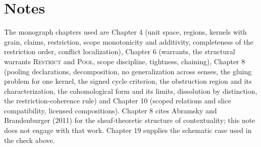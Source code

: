 \documentclass[11pt]{article}
\theoremstyle{plain}
\theoremstyle{definition}
\theoremstyle{remark}
\begin{document}
\section*{Notes}

The monograph chapters used are Chapter 4 (unit space, regions, kernels with grain, claims, restriction, scope monotonicity and additivity, completeness of the restriction order, conflict localization), Chapter 6 (warrants, the structural warrants \textsc{Restrict} and \textsc{Pool}, scope discipline, tightness, chaining), Chapter 8 (pooling declarations, decomposition, no generalization across senses, the gluing problem for one kernel, the signed cycle criterion, the obstruction region and its characterization, the cohomological form and its limits, dissolution by distinction, the restriction-coherence rule) and Chapter 10 (scoped relations and slice compatibility, licensed compositions). Chapter 8 cites Abramsky and Brandenburger (2011) for the sheaf-theoretic structure of contextuality; this note does not engage with that work. Chapter 19 supplies the schematic case used in the check above.
\end{document}

